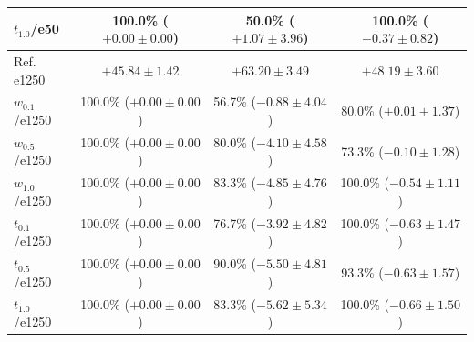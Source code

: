 \begin{table}[t]
\begin{tabular}{p{1.5cm}ccc}
$t_{1.0}$/e50 & \makecell{100.0\% \\ ($+0.00 \pm 0.00$)} & \makecell{50.0\% \\ ($+1.07 \pm 3.96$)} & \makecell{100.0\% \\ ($-0.37 \pm 0.82$)} \\
\midrule
Ref. e1250 & $+45.84 \pm 1.42$ & $+63.20 \pm 3.49$ & $+48.19 \pm 3.60$ \\ \hline
$w_{0.1}$/e1250 & \makecell{100.0\% \\ ($+0.00 \pm 0.00$)} & \makecell{56.7\% \\ ($-0.88 \pm 4.04$)} & \makecell{80.0\% \\ ($+0.01 \pm 1.37$)} \\ \hdashline
$w_{0.5}$/e1250 & \makecell{100.0\% \\ ($+0.00 \pm 0.00$)} & \makecell{80.0\% \\ ($-4.10 \pm 4.58$)} & \makecell{73.3\% \\ ($-0.10 \pm 1.28$)} \\ \hdashline
$w_{1.0}$/e1250 & \makecell{100.0\% \\ ($+0.00 \pm 0.00$)} & \makecell{83.3\% \\ ($-4.85 \pm 4.76$)} & \makecell{100.0\% \\ ($-0.54 \pm 1.11$)} \\ \hdashline
$t_{0.1}$/e1250 & \makecell{100.0\% \\ ($+0.00 \pm 0.00$)} & \makecell{76.7\% \\ ($-3.92 \pm 4.82$)} & \makecell{100.0\% \\ ($-0.63 \pm 1.47$)} \\ \hdashline
$t_{0.5}$/e1250 & \makecell{100.0\% \\ ($+0.00 \pm 0.00$)} & \makecell{90.0\% \\ ($-5.50 \pm 4.81$)} & \makecell{93.3\% \\ ($-0.63 \pm 1.57$)} \\ \hdashline
$t_{1.0}$/e1250 & \makecell{100.0\% \\ ($+0.00 \pm 0.00$)} & \makecell{83.3\% \\ ($-5.62 \pm 5.34$)} & \makecell{100.0\% \\ ($-0.66 \pm 1.50$)} \\
\bottomrule
\end{tabular}
\end{table}
